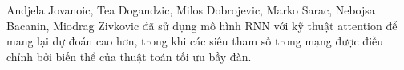 Andjela Jovanoic, Tea Dogandzic, Milos Dobrojevic, Marko Sarac, Nebojsa Bacanin, Miodrag Zivkovic\cite{10263962} đã sử dụng mô hình RNN với kỹ thuật attention để mang lại dự đoán cao hơn, trong khi các siêu tham số trong mạng được điều chỉnh bởi biến thể của thuật toán tối ưu bầy đàn.